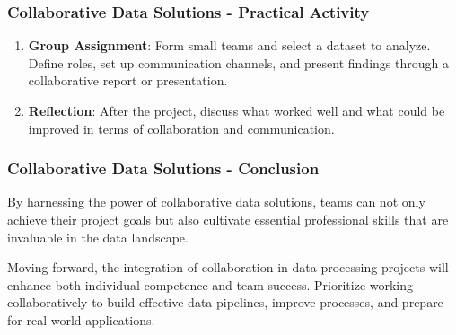 \documentclass{beamer}
\begin{document}
\begin{frame}[fragile]
    \frametitle{Collaborative Data Solutions - Practical Activity}
    \begin{enumerate}
        \item \textbf{Group Assignment}: 
        Form small teams and select a dataset to analyze. Define roles, set up communication channels, and present findings through a collaborative report or presentation.
        
        \item \textbf{Reflection}: 
        After the project, discuss what worked well and what could be improved in terms of collaboration and communication.
    \end{enumerate}
\end{frame}

\begin{frame}[fragile]
    \frametitle{Collaborative Data Solutions - Conclusion}
    By harnessing the power of collaborative data solutions, teams can not only achieve their project goals but also cultivate essential professional skills that are invaluable in the data landscape.
    
    Moving forward, the integration of collaboration in data processing projects will enhance both individual competence and team success. Prioritize working collaboratively to build effective data pipelines, improve processes, and prepare for real-world applications.
\end{frame}
\end{document}
